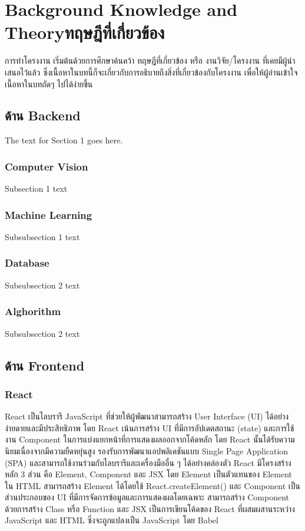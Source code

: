 \chapter{\ifenglish Background Knowledge and Theory\else ทฤษฎีที่เกี่ยวข้อง\fi}

การทำโครงงาน เริ่มต้นด้วยการศึกษาค้นคว้า ทฤษฎีที่เกี่ยวข้อง หรือ งานวิจัย/โครงงาน ที่เคยมีผู้นำเสนอไว้แล้ว ซึ่งเนื้อหาในบทนี้ก็จะเกี่ยวกับการอธิบายถึงสิ่งที่เกี่ยวข้องกับโครงงาน เพื่อให้ผู้อ่านเข้าใจเนื้อหาในบทถัดๆ ไปได้ง่ายขึ้น

\section{ด้าน Backend}
The text for Section 1 goes here.

\subsection{Computer Vision}

Subsection 1 text

\subsection{Machine Learning}
Subsubsection 1 text

\subsection{Database}
Subsubsection 2 text

\subsection{Alghorithm}
Subsubsection 2 text

\section{ด้าน Frontend}


\subsection{React}
    React เป็นไลบรารี JavaScript ที่ช่วยให้ผู้พัฒนาสามารถสร้าง User Interface (UI) ได้อย่างง่ายดายและมีประสิทธิภาพ โดย React เน้นการสร้าง UI ที่มีการอัปเดตสถานะ (state) 
และการใช้งาน Component ในการแบ่งแยกหน้าที่การแสดงผลออกจากโค้ดหลัก โดย React นั้นได้รับความนิยมเนื่องจากมีความยืดหยุ่นสูง รองรับการพัฒนาแอปพลิเคชันแบบ Single Page Application (SPA) 
และสามารถใช้งานร่วมกับไลบรารีและเครื่องมืออื่น ๆ ได้อย่างคล่องตัว
    React มีโครงสร้างหลัก 3 ส่วน คือ Element, Component และ JSX โดย Element เป็นตัวแทนของ Element ใน HTML สามารถสร้าง Element ได้โดยใช้ React.createElement() 
และ Component เป็นส่วนประกอบของ UI ที่มีการจัดการข้อมูลและการแสดงผลโดยเฉพาะ สามารถสร้าง Component ด้วยการสร้าง Class หรือ Function และ JSX เป็นการเขียนโค้ดของ React 
ที่ผสมผสานระหว่าง JavaScript และ HTML ซึ่งจะถูกแปลงเป็น JavaScript โดย Babel\cite{React}


